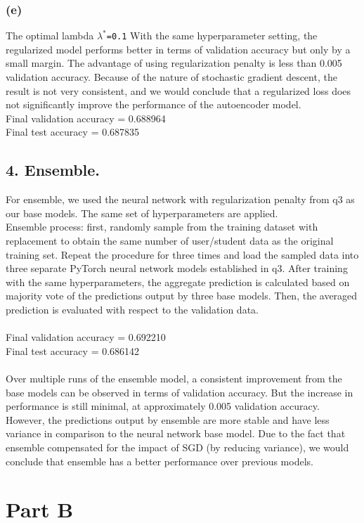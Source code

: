 \documentclass{article}
\newcommand{\coding}[1]{\colorbox{light-gray}{\texttt{#1}}}
\begin{document}
\begin{spacing}{1.5}
\subsubsection*{(e)}
The optimal lambda \coding{$\lambda^*$=0.1}
With the same hyperparameter setting, the regularized model performs better in terms of validation accuracy but only by a small margin. The advantage of using regularization penalty is less than 0.005 
validation accuracy. Because of the nature of stochastic gradient descent, the result is not very consistent, and we would conclude that a regularized loss does not significantly improve the performance 
of the autoencoder model. \\
Final validation accuracy = 0.688964\\
Final test accuracy = 0.687835\\
\subsection*{4. Ensemble.}
For ensemble, we used the neural network with regularization penalty from q3 as our base models. The same set of hyperparameters are applied. \\
Ensemble process: first, randomly sample from the training dataset with replacement to obtain the same number of user/student data as the original training set. Repeat the procedure for three times and load 
the sampled data into three separate PyTorch neural network models established in q3. After training with the same hyperparameters, the aggregate prediction is calculated based on majority vote of the predictions 
output by three base models. Then, the averaged prediction is evaluated with respect to the validation data. \\
\\
Final validation accuracy = 0.692210\\
Final test accuracy = 0.686142\\\\
Over multiple runs of the ensemble model, a consistent improvement from the base models can be observed in terms of validation accuracy. But the increase in performance is still minimal, at approximately 
0.005 validation accuracy. However, the predictions output by ensemble are more stable and have less variance in comparison to the neural network base model. Due to the fact that ensemble compensated for the 
impact of SGD (by reducing variance), we would conclude that ensemble has a better performance over previous models. 
\newpage
\section*{Part B}

\end{spacing}
\end{document}
